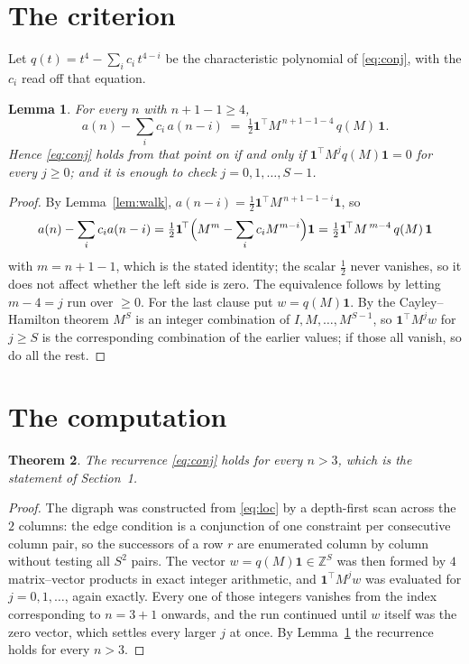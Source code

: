 \documentclass[11pt,a4paper]{article}
\theoremstyle{plain}
\newtheorem{theorem}{Theorem}
\newtheorem{lemma}[theorem]{Lemma}
\theoremstyle{definition}
\begin{document}
\section{The criterion}

Let $q(t)=t^{4}-\sum_i c_i\,t^{4-i}$ be the characteristic polynomial of
\eqref{eq:conj}, with the $c_i$ read off that equation.

\begin{lemma}\label{lem:crit}
For every $n$ with $n+1-1\ge4$,
\[
a(n)-\sum_i c_i\,a(n-i)\;=\;\tfrac1{2}\mathbf{1}^{\!\top}M^{\,n+1-1-4}\,q(M)\,\mathbf{1} .
\]
Hence \eqref{eq:conj} holds from that point on if and only if
$\mathbf{1}^{\!\top}M^{j}q(M)\mathbf{1}=0$ for every $j\ge0$; and it is enough to check
$j=0,1,\dots,S-1$.
\end{lemma}

\begin{proof}
By Lemma~\ref{lem:walk}, $a(n-i)=\tfrac1{2}\mathbf{1}^{\!\top}M^{\,n+1-1-i}\mathbf{1}$, so
\[
a(n)-\sum_i c_i a(n-i)
=\tfrac1{2}\mathbf{1}^{\!\top}\Bigl(M^{m}-\sum_i c_i M^{m-i}\Bigr)\mathbf{1}
=\tfrac1{2}\mathbf{1}^{\!\top}M^{\,m-4}\,q(M)\,\mathbf{1}
\]
with $m=n+1-1$, which is the stated identity; the scalar $\tfrac1{2}$ never vanishes, so
it does not affect whether the left side is zero. The equivalence follows by letting
$m-4=j$ run over $\ge0$. For the last clause put $w=q(M)\mathbf{1}$. By the
Cayley--Hamilton theorem $M^{S}$ is an integer combination of $I,M,\dots,M^{S-1}$, so
$\mathbf{1}^{\!\top}M^{j}w$ for $j\ge S$ is the corresponding combination of the earlier
values; if those all vanish, so do all the rest.
\end{proof}

\section{The computation}

\begin{theorem}
The recurrence \eqref{eq:conj} holds for every $n>3$, which is the statement of
Section~1.
\end{theorem}

\begin{proof}
The digraph was constructed from \eqref{eq:loc} by a depth-first scan across the $2$
columns: the edge condition is a conjunction of one constraint per consecutive column
pair, so the successors of a row $r$ are enumerated column by column without testing all
$S^2$ pairs. The vector $w=q(M)\mathbf{1}\in\mathbb{Z}^{S}$ was then formed by $4$
matrix--vector products in exact integer arithmetic, and $\mathbf{1}^{\!\top}M^{j}w$ was
evaluated for $j=0,1,\dots$, again exactly. Every one of those integers vanishes from the
index corresponding to $n=3+1$ onwards, and the run continued until $w$ itself was the
zero vector, which settles every larger $j$ at once. By Lemma~\ref{lem:crit} the recurrence
holds for every $n>3$.
\end{proof}
\end{document}
